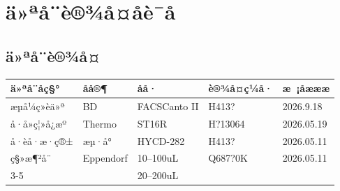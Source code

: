 \documentclass[UTF8,10pt,a4paper,fontset=fandol]{ctexart}
\newcommand{\fieldvalue}[1]{#1}
\newcommand{\handwritten}[1]{#1}
\begin{document}
\section{ä»ªå¨è®¾å¤åè¯å}

\subsection{ä»ªå¨è®¾å¤}

\begin{center}
\small
\begin{tabularx}{\textwidth}{|p{}|p{}|p{}|X|p{}|}
\hline
ä»ªå¨åç§° & åå®¶ & åå· & è®¾å¤ç¼å· & æ ¡åæææ \\ \hline
æµå¼ç»èä»ª & BD & FACSCanto II &
\fieldvalue{\handwritten{H413?}} &
\fieldvalue{\handwritten{2026.9.18}} \\ \hline
å·å»ç¦»å¿æº & Thermo & ST16R &
\fieldvalue{\handwritten{H?13064}} &
\fieldvalue{\handwritten{2026.05.19}} \\ \hline
å·èå·æ·ç®± & æµ·å° & HYCD-282 &
\fieldvalue{\handwritten{H413?}} &
\fieldvalue{\handwritten{2026.05.11}} \\ \hline
ç§»æ¶²å¨ & Eppendorf &
\fieldvalue{\handwritten{10--100uL}} &
\fieldvalue{\handwritten{Q687?0K}} &
\fieldvalue{\handwritten{2026.05.11}} \\ \cline{3-5}
& &
\fieldvalue{\handwritten{20--200uL}} &

\end{tabularx}
\end{center}
\end{document}
